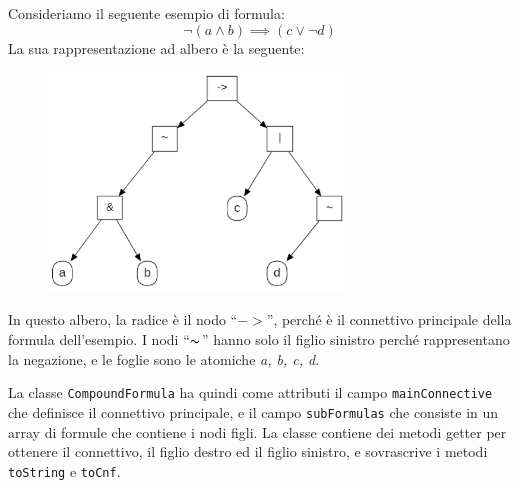 \documentclass[a4paper,12pt]{report}
\begin{document}
Consideriamo il seguente esempio di formula:
\[\lnot(a \land b) \implies (c \lor \lnot d)\]
La sua rappresentazione ad albero è la seguente:
\begin{figure}[H]
    \centering
    \includegraphics[width=0.7\textwidth, height=0.4\textheight]{img/albero.png}
\end{figure}
In questo albero, la radice è il nodo ``$->$'', perché è il connettivo principale della formula dell'esempio. I nodi ``$\thicksim$'' hanno solo il figlio sinistro perché rappresentano la negazione, e le foglie sono le atomiche \emph{a, b, c, d}.

La classe \texttt{CompoundFormula} ha quindi come attributi il campo \texttt{mainConnective} che definisce il connettivo principale, e il campo \texttt{subFormulas} che consiste in un array di formule che contiene i nodi figli. La classe contiene dei metodi getter per ottenere il connettivo, il figlio destro ed il figlio sinistro, e sovrascrive i metodi \texttt{toString} e \texttt{toCnf}.
\end{document}
